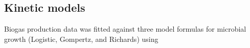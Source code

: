 \subsection{Kinetic models}
Biogas production data was fitted against three model formulas for microbial growth (Logistic, Gompertz, and Richards) using 
